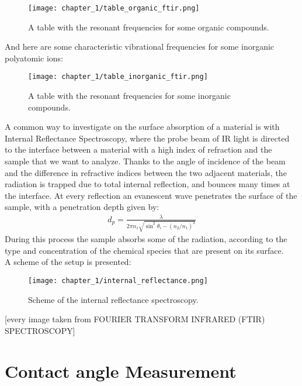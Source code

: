 \begin{figure}[H]
    \centering
    \texttt{[image: chapter\_1/table\_organic\_ftir.png]}
    \vspace*{-20pt}
    \caption{A table with the resonant frequencies for some organic compounds.}
    \label{fig:table_organic}
\end{figure}
And here are some characteristic vibrational frequencies for some inorganic polyatomic ions:
\begin{figure}[H]
    \centering
    \texttt{[image: chapter\_1/table\_inorganic\_ftir.png]}
    \vspace*{-10pt}
    \caption{A table with the resonant frequencies for some inorganic compounds.}
    \label{fig:table_inorganic}
\end{figure}
A common way to investigate on the surface absorption of a material is with Internal Reflectance Spectroscopy, where the probe beam of IR light is directed to the interface between a material with a high index of refraction and the sample that we want to analyze. Thanks to the angle of incidence of the beam and the difference in refractive indices between the two adjacent materials, the radiation is trapped due to total internal reflection, and bounces many times at the interface. At every reflection an evanescent wave penetrates the surface of the sample, with a penetration depth given by:
\begin{align}
    d_p=\frac{\lambda}{2\pi n_1\sqrt{\sin^2{\theta_i}-\left(n_2/n_1\right)^2}} \label{eq:pen_depth_wave}
\end{align}
During this process the sample absorbs some of the radiation, according to the type and concentration of the chemical species that are present on its surface.
\\
A scheme of the setup is presented: 

\begin{figure}[H]
    \centering
    \texttt{[image: chapter\_1/internal\_reflectance.png]}
    \vspace*{10pt}
    \caption{Scheme of the internal reflectance spectroscopy. }
    \label{fig:internal_reflectance}
\end{figure}

[every image taken from FOURIER TRANSFORM INFRARED (FTIR) SPECTROSCOPY]

\section{Contact angle Measurement}
\label{sec:contact_angle_measurement}

